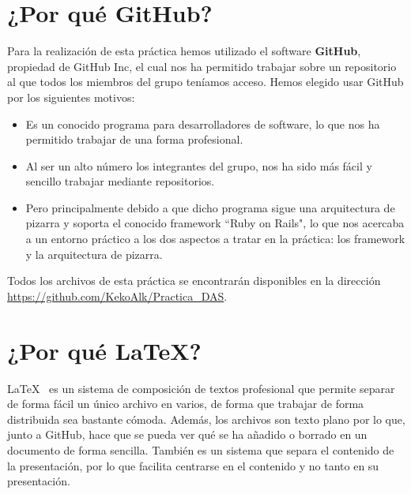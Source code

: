 \section*{¿Por qué GitHub?}
Para la realización de esta práctica hemos utilizado el software \textbf{GitHub}, propiedad de 	{GitHub Inc}, el cual nos ha permitido trabajar sobre un repositorio al que todos los miembros del grupo teníamos acceso. Hemos elegido usar GitHub por los siguientes motivos:
\begin{itemize}
	\item Es un conocido programa para desarrolladores de software, lo que nos ha permitido trabajar de una forma profesional.
	\item Al ser un alto número los integrantes del grupo, nos ha sido más fácil y sencillo trabajar mediante repositorios. 
	\item Pero principalmente debido a que dicho programa sigue una arquitectura de pizarra y soporta el conocido framework ``Ruby on Rails", lo que nos acercaba a un entorno práctico a los dos aspectos a tratar en la práctica: los framework y la arquitectura de pizarra.
\end{itemize}

Todos los archivos de esta práctica se encontrarán disponibles en la dirección
\url{https://github.com/KekoAlk/Practica_DAS}.

\section*{¿Por qué \LaTeX?}
\LaTeX~ es un sistema de composición de textos profesional que permite separar de forma fácil un único archivo en varios, de forma que trabajar de forma distribuida sea bastante cómoda. Además, los archivos son texto plano por lo que, junto a GitHub, hace que se pueda ver qué se ha añadido o borrado en un documento de forma sencilla. También es un sistema que separa el contenido de la presentación, por lo que facilita centrarse en el contenido y no tanto en su presentación.\\




